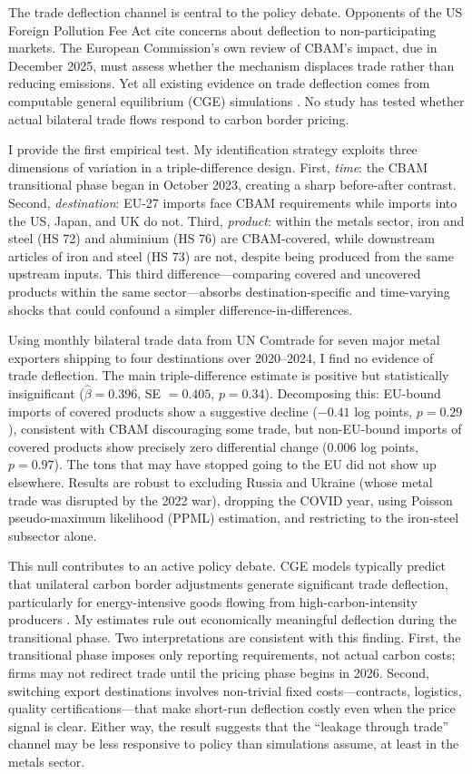 \documentclass[12pt]{article}
\begin{document}
The trade deflection channel is central to the policy debate. Opponents of the US Foreign Pollution Fee Act cite concerns about deflection to non-participating markets. The European Commission's own review of CBAM's impact, due in December 2025, must assess whether the mechanism displaces trade rather than reducing emissions. Yet all existing evidence on trade deflection comes from computable general equilibrium (CGE) simulations \citep{bohringer2010,bohringer2014,branger2014}. No study has tested whether actual bilateral trade flows respond to carbon border pricing.

I provide the first empirical test. My identification strategy exploits three dimensions of variation in a triple-difference design. First, \textit{time}: the CBAM transitional phase began in October 2023, creating a sharp before-after contrast. Second, \textit{destination}: EU-27 imports face CBAM requirements while imports into the US, Japan, and UK do not. Third, \textit{product}: within the metals sector, iron and steel (HS 72) and aluminium (HS 76) are CBAM-covered, while downstream articles of iron and steel (HS 73) are not, despite being produced from the same upstream inputs. This third difference---comparing covered and uncovered products within the same sector---absorbs destination-specific and time-varying shocks that could confound a simpler difference-in-differences.

Using monthly bilateral trade data from UN Comtrade for seven major metal exporters shipping to four destinations over 2020--2024, I find no evidence of trade deflection. The main triple-difference estimate is positive but statistically insignificant ($\hat{\beta} = 0.396$, SE $= 0.405$, $p = 0.34$). Decomposing this: EU-bound imports of covered products show a suggestive decline ($-0.41$ log points, $p = 0.29$), consistent with CBAM discouraging some trade, but non-EU-bound imports of covered products show precisely zero differential change ($0.006$ log points, $p = 0.97$). The tons that may have stopped going to the EU did not show up elsewhere. Results are robust to excluding Russia and Ukraine (whose metal trade was disrupted by the 2022 war), dropping the COVID year, using Poisson pseudo-maximum likelihood (PPML) estimation, and restricting to the iron-steel subsector alone.

This null contributes to an active policy debate. CGE models typically predict that unilateral carbon border adjustments generate significant trade deflection, particularly for energy-intensive goods flowing from high-carbon-intensity producers \citep{bohringer2014}. My estimates rule out economically meaningful deflection during the transitional phase. Two interpretations are consistent with this finding. First, the transitional phase imposes only reporting requirements, not actual carbon costs; firms may not redirect trade until the pricing phase begins in 2026. Second, switching export destinations involves non-trivial fixed costs---contracts, logistics, quality certifications---that make short-run deflection costly even when the price signal is clear. Either way, the result suggests that the ``leakage through trade'' channel may be less responsive to policy than simulations assume, at least in the metals sector.
\end{document}
